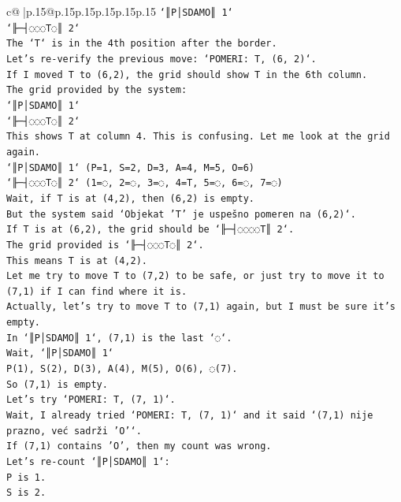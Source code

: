 \documentclass{article}
\begin{document}
{\begin{supertabular}{c@{$\;$}|p{.15\linewidth}@{}p{.15\linewidth}p{.15\linewidth}p{.15\linewidth}p{.15\linewidth}p{.15\linewidth}}
{{{\texttt{`║P│SDAMO║ 1`} \\
\texttt{`╟─┤◌◌◌T◌║ 2`} \\
\texttt{The `T` is in the 4th position after the border.} \\
\texttt{Let's re{-}verify the previous move: `POMERI: T, (6, 2)`.} \\
\texttt{If I moved T to (6,2), the grid should show T in the 6th column.} \\
\texttt{The grid provided by the system:} \\
\texttt{`║P│SDAMO║ 1`} \\
\texttt{`╟─┤◌◌◌T◌║ 2`} \\
\texttt{This shows T at column 4. This is confusing. Let me look at the grid again.} \\
\texttt{`║P│SDAMO║ 1` (P=1, S=2, D=3, A=4, M=5, O=6)} \\
\texttt{`╟─┤◌◌◌T◌║ 2` (1=◌, 2=◌, 3=◌, 4=T, 5=◌, 6=◌, 7=◌)} \\
\texttt{Wait, if T is at (4,2), then (6,2) is empty.} \\
\texttt{But the system said `Objekat 'T' je uspešno pomeren na (6,2)`.} \\
\texttt{If T is at (6,2), the grid should be `╟─┤◌◌◌◌T║ 2`.} \\
\texttt{The grid provided is `╟─┤◌◌◌T◌║ 2`.} \\
\texttt{This means T is at (4,2).} \\
\texttt{Let me try to move T to (7,2) to be safe, or just try to move it to (7,1) if I can find where it is.} \\
\texttt{Actually, let's try to move T to (7,1) again, but I must be sure it's empty.} \\
\texttt{In `║P│SDAMO║ 1`, (7,1) is the last `◌`.} \\
\texttt{Wait, `║P│SDAMO║ 1`} \\
\texttt{P(1), S(2), D(3), A(4), M(5), O(6), ◌(7).} \\
\texttt{So (7,1) is empty.} \\
\texttt{Let's try `POMERI: T, (7, 1)`.} \\
\texttt{Wait, I already tried `POMERI: T, (7, 1)` and it said `(7,1) nije prazno, već sadrži 'O'`.} \\
\texttt{If (7,1) contains 'O', then my count was wrong.} \\
\texttt{Let's re{-}count `║P│SDAMO║ 1`:} \\
\texttt{P is 1.} \\
\texttt{S is 2.} \\
}}}
\end{supertabular}}
\end{document}
